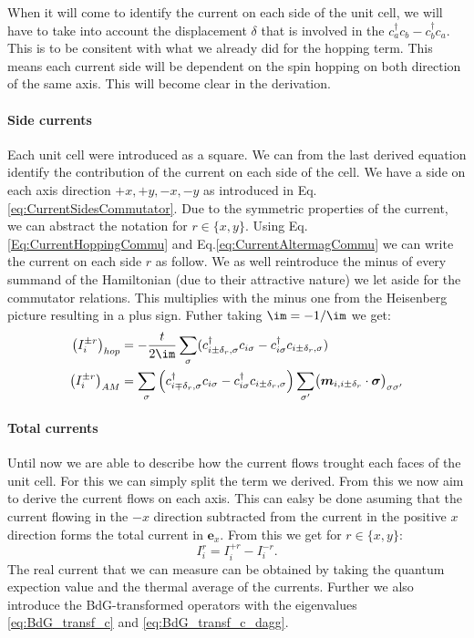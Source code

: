 \documentclass[../main.tex]{subfile}
\begin{document}
When it will come to identify the current on each side of the unit cell, we will have to take into account the displacement $\delta$ that is involved in the $c^{\dagger}_a c_b - c^{\dagger}_b c_a$.
This is to be consitent with what we already did for the hopping term. This means each current side will be dependent on the spin hopping on both direction of the same axis.
This will become clear in the derivation.\\

\paragraph{Side currents}
Each unit cell were introduced as a square. We can from the last derived equation identify the contribution of the current on each side of the cell. We have a side on 
each axis direction $+x, +y, -x, -y$ as introduced in Eq.\ref{eq:CurrentSidesCommutator}. Due to the symmetric properties of the current, we can abstract the notation
for $r\in\{x,y\}$. Using Eq.\ref{Eq:CurrentHoppingCommu} and Eq.\ref{eq:CurrentAltermagCommu} we can write the current on each side $r$ as follow.
We as well reintroduce the minus of every summand of the Hamiltonian (due to their attractive nature) we let aside for the commutator relations. This multiplies 
with the minus one from the Heisenberg picture resulting in a plus sign. Futher taking $\im = -1/\im$ we get:
\begin{align}
    \left(I_{i}^{\pm r}\right)_{hop} &= -\frac{t}{2\im}\sum_{\sigma}(c_{i\pm\delta_r,\sigma}^{\dagger}c_{i\sigma} -c_{i\sigma}^{\dagger}c_{i\pm\delta_r,\sigma})  \\
    \left(I_{i}^{\pm r}\right)_{AM} &= \sum_{\sigma}\left(c_{i\mp\delta_r,\sigma}^{\dagger}c_{i\sigma} - c_{i\sigma}^{\dagger}c_{i\pm\delta_r,\sigma} \right) 
    \sum_{\sigma'}\bigl(\bm{m}_{i,i\pm\delta_r}\cdot\bm{\sigma}\bigr)_{\sigma\sigma'}
\end{align}


\paragraph{Total currents}
Until now we are able to describe how the current flows trought each faces of the unit cell. For this we can simply split the term we derived.
From this we now aim to derive the current flows on each axis.
This can ealsy be done asuming that the current flowing in the $-x$ direction subtracted from the current in the positive $x$ direction forms the total current in $\bm{e}_x$.
From this we get for $r\in\{x,y\}$:
\[
    I_{i}^{r} = I_{i}^{+r} - I_{i}^{-r}.
\]
The real current that we can measure can be obtained by taking the quantum expection value and the thermal average of the currents. Further we also introduce the 
BdG-transformed operators with the eigenvalues \ref{eq:BdG_transf_c} and \ref{eq:BdG_transf_c_dagg}. \\
\end{document}
